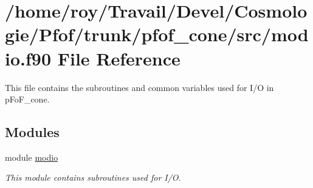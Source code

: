 \hypertarget{pfof__cone_2src_2modio_8f90}{}\section{/home/roy/\+Travail/\+Devel/\+Cosmologie/\+Pfof/trunk/pfof\+\_\+cone/src/modio.f90 File Reference}
\label{pfof__cone_2src_2modio_8f90}


This file contains the subroutines and common variables used for I/O in p\+Fo\+F\+\_\+cone.  


\subsection*{Modules}
\begin{DoxyCompactItemize}
\item 
module \hyperlink{namespacemodio}{modio}
\begin{DoxyCompactList}\small\item\em This module contains subroutines used for I/O. \end{DoxyCompactList}\end{DoxyCompactItemize}
